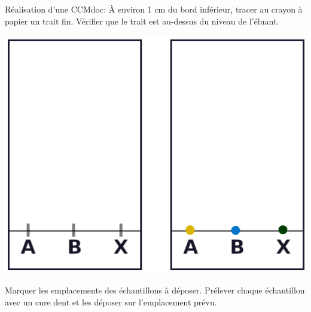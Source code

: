\begin{doc}{Réalisation d'une CCM}{doc:}
{    \vspace*{-12pt}
    À environ 1 cm du bord inférieur, tracer au crayon à papier un trait fin.
    Vérifier que le trait est au-dessus du niveau de l'éluant.
  }{
    \begin{center}
      \includegraphics[height=0.15\textheight]{images/chimie/CCM/CCM_etapes_depot.png}
    \end{center}
    
    \vspace*{-12pt}
    Marquer les emplacements des échantillons à déposer.
    Prélever chaque échantillon avec un cure dent et les déposer sur l'emplacement prévu.
  }
  
  \bigskip
  
\end{doc}
